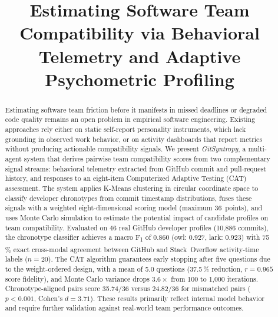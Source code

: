 \documentclass[conference]{IEEEtran}
\begin{document}
\title{Estimating Software Team Compatibility via Behavioral
Telemetry and Adaptive Psychometric Profiling}

\author{
}

\maketitle

\begin{abstract}
Estimating software team friction before it manifests in missed
deadlines or degraded code quality remains an open problem in
empirical software engineering.  Existing approaches rely either on
static self-report personality instruments, which lack grounding in
observed work behavior, or on activity dashboards that report metrics
without producing actionable compatibility signals.  We present
\textit{GitSyntropy}, a multi-agent system that derives pairwise team
compatibility scores from two complementary signal streams: behavioral
telemetry extracted from GitHub commit and pull-request history, and
responses to an eight-item Computerized Adaptive Testing (CAT)
assessment.  The system applies K-Means clustering in circular
coordinate space to classify developer chronotypes from commit
timestamp distributions, fuses these signals with a weighted
eight-dimensional scoring model (maximum 36~points), and uses Monte
Carlo simulation to estimate the potential impact of candidate
profiles on team compatibility.  Evaluated on 46 real GitHub developer profiles
(10,886 commits), the chronotype classifier achieves a macro
F\textsubscript{1} of 0.860 (owl: 0.927, lark: 0.923) with 75\,\%
exact cross-modal agreement between GitHub and Stack~Overflow
activity-time labels ($n{=}20$).  The CAT algorithm guarantees early
stopping after five questions due to the weight-ordered design, with
a mean of 5.0 questions (37.5\,\%
reduction, $r{=}0.965$ score fidelity), and Monte Carlo variance
drops $3.6{\times}$ from 100 to 1,000 iterations.
Chronotype-aligned pairs score 35.74/36 versus 24.82/36 for
mismatched pairs ($p < 0.001$, Cohen's $d = 3.71$).
These results primarily reflect internal model behavior and require further validation against real-world team performance outcomes.
\end{abstract}
\end{document}
